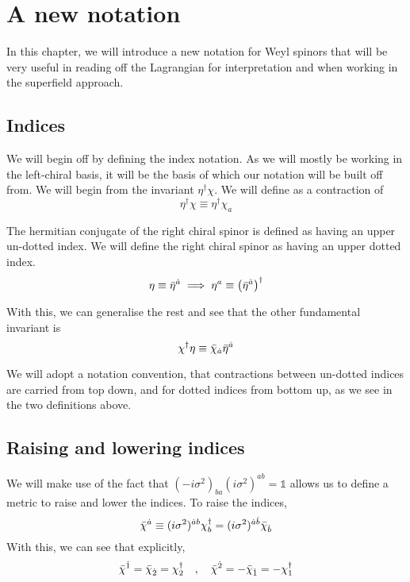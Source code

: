 \chapter{A new notation}
\label{ch:3}
In this chapter, we will introduce a new notation for Weyl spinors that will be very useful in reading off the Lagrangian for interpretation and when working in the superfield approach.

\section{Indices}
\label{ch:3:indices}
We will begin off by defining the index notation. As we will mostly be working in the left-chiral basis, it will be the basis of which our notation will be built off from. We will begin from the invariant $\eta^\dagger\chi$. We will define as a contraction of
\begin{equation}
    \eta^\dagger \chi \equiv \eta^\dagger \chi_a
    \label{eqn:3:first definition}
\end{equation}

The hermitian conjugate of the right chiral spinor is defined as having an upper un-dotted index. We will define the right chiral spinor as having an upper dotted index.
\begin{equation}
    \eta \equiv \Bar{\eta}^{\Dot{a}} \implies \eta^a \equiv \left( \Bar{\eta}^{\Dot{a}}\right) ^\dagger
\end{equation}

With this, we can generalise the rest and see that the other fundamental invariant is
\begin{equation}
    \chi^\dagger\eta \equiv \Bar{\chi}_{\Dot{a}}\Bar{\eta}^{\Dot{a}}
\end{equation}

We will adopt a notation convention, that contractions between un-dotted indices are carried from top down, and for dotted indices from bottom up, as we see in the two definitions above.

\section{Raising and lowering indices}
We will make use of the fact that $(-i\sigma^2)_{ba}(i\sigma^2)^{ab} = \mathbb{1}$ allows us to define a metric to raise and lower the indices. To raise the indices,
\begin{equation}
    \Bar{\chi}^{\Dot{a}} \equiv (i\sigma^2)^{\Dot{a}b}\chi_b^\dagger = (i\sigma^2)^{\dot{a}\dot{b}}\Bar{\chi}_{\dot{b}}
    \label{eqn:3:raising operation}
\end{equation}
With this, we can see that explicitly,
\begin{equation}
    \Bar{\chi}^{\dot{1}} = \Bar{\chi}_{\dot{2}} = \chi_2^\dagger \quad , \quad \Bar{\chi}^{\dot{2}} = - \Bar{\chi}_{\dot{1}} = -\chi_1^\dagger
    \label{eqn:3:explicit raising operation}
\end{equation}


